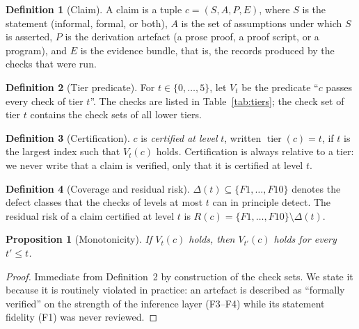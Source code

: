 \documentclass[11pt]{article}
\theoremstyle{plain}
\newtheorem{proposition}{Proposition}
\theoremstyle{definition}
\newtheorem{definition}{Definition}
\newcommand{\tier}{\operatorname{tier}}
\begin{document}
\begin{definition}[Claim]
A claim is a tuple $c=(S,A,P,E)$, where $S$ is the statement (informal, formal, or both),
$A$ is the set of assumptions under which $S$ is asserted, $P$ is the derivation artefact
(a prose proof, a proof script, or a program), and $E$ is the evidence bundle, that is, the
records produced by the checks that were run.
\end{definition}

\begin{definition}[Tier predicate]
For $t\in\{0,\dots,5\}$, let $V_t$ be the predicate ``$c$ passes every check of tier $t$''.
The checks are listed in Table~\ref{tab:tiers}; the check set of tier $t$ contains the check
sets of all lower tiers.
\end{definition}

\begin{definition}[Certification]
$c$ is \emph{certified at level} $t$, written $\tier(c)=t$, if $t$ is the largest index such
that $V_t(c)$ holds. Certification is always relative to a tier: we never write that a claim
is verified, only that it is certified at level $t$.
\end{definition}

\begin{definition}[Coverage and residual risk]
$\Delta(t)\subseteq\{F1,\dots,F10\}$ denotes the defect classes that the checks of levels at
most $t$ can in principle detect. The residual risk of a claim certified at level $t$ is
$R(c)=\{F1,\dots,F10\}\setminus\Delta(t)$.
\end{definition}

\begin{proposition}[Monotonicity]
\label{prop:mono}
If $V_t(c)$ holds, then $V_{t'}(c)$ holds for every $t'\le t$.
\end{proposition}
\begin{proof}
Immediate from Definition~2 by construction of the check sets. We state it because it is
routinely violated in practice: an artefact is described as ``formally verified'' on the
strength of the inference layer (F3--F4) while its statement fidelity (F1) was never reviewed.
\end{proof}
\end{document}

